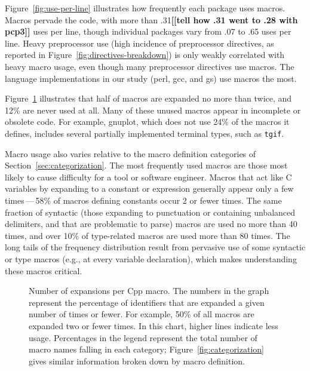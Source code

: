 \documentclass[10pt]{article}
\newcommand{\comment}[1]{\textbf{[[#1]]}}
\newcommand{\pkg}[1]{\textsf{#1}}
\newcommand{\captionsmall}[1]{\caption[]{\small #1}}
\begin{document}
Figure~\ref{fig:use-per-line} illustrates how frequently each package uses
macros.  Macros pervade the code, with more than .31\comment{tell how .31
went to .28 with pcp3} uses per line, though
individual packages vary from .07 to .65 uses per line.  Heavy preprocessor
use (high incidence of preprocessor directives, as reported in
Figure~\ref{fig:directives-breakdown}) is only weakly correlated with
heavy macro usage, even though many preprocessor directives use macros.
The language implementations in our study (\pkg{perl}, \pkg{gcc}, and
\pkg{gs}) use macros the most.

Figure~\ref{fig:freq-use-cat}
illustrates that half of macros are expanded no more than twice, and 12\% are
never used at all.  Many of these unused macros appear in incomplete or
obsolete code.  For example, \pkg{gnuplot}, which does not use 24\% of the
macros it defines, includes several partially implemented terminal types,
such as {\tt tgif}.

Macro usage also varies relative to the macro definition categories of
Section~\ref{sec:categorization}.
The most frequently used macros are those most likely to cause difficulty
for a tool or software engineer.  Macros that act like C variables by
expanding to a constant or expression generally appear only a few
times\,---\,58\% of macros defining constants occur 2 or fewer times.
The same fraction of syntactic (those expanding to punctuation or
containing unbalanced delimiters, and that are problematic to parse)
macros are used no more than 40 times, and over 10\% of type-related macros are
used more than 80 times.  The long tails of the frequency distribution
result from pervasive use of some syntactic or type macros (e.g., at every
variable declaration), which makes understanding these macros critical.


\begin{figure}
\centerline{}
\captionsmall{Number of expansions per Cpp macro.  The numbers in the
  graph represent the percentage of identifiers that are expanded a given
  number of times or fewer.  For example, 50\% of all macros are expanded
  two or fewer times.  In this chart, higher lines indicate less usage.
  Percentages in the legend represent the total number of
  macro names falling in each category; Figure~\ref{fig:categorization}
  gives similar information broken down by macro definition.}
\label{fig:freq-use-cat}
\end{figure}
\end{document}
